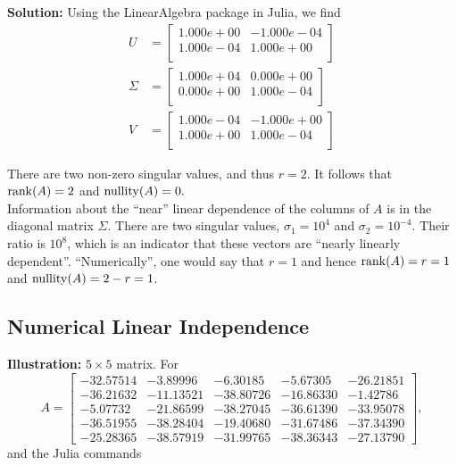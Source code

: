 \textbf{Solution:} Using the LinearAlgebra package in Julia, we find
\begin{align*}
    U& =\left[
\begin{array}{cc}
1.000e+00 & -1.000e-04 \\
1.000e-04 & 1.000e+00 \\
\end{array}
\right] \\
\Sigma&= \left[
\begin{array}{cc}
1.000e+04  & 0.000e+00\\
0.000e+00 & 1.000e-04 \\
\end{array}
\right]\\
V&= \left[
\begin{array}{cc}
1.000e-04 & -1.000e+00 \\
1.000e+00 & 1.000e-04 \\
\end{array}
\right]
\end{align*}

There are two non-zero singular values, and thus $r=2$. It follows that $\mathrm{rank}(A)=2$ and $\mathrm{nullity}(A)=0.$\\

Information about the ``near'' linear dependence of the columns of $A$ is in the diagonal matrix $\Sigma$. There are two singular values, $\sigma_1=10^4$ and $\sigma_2 = 10^{-4}$. Their ratio is $10^8$, which is an indicator that these vectors are ``nearly linearly dependent''. ``Numerically'', one would say that $r=1$ and hence $\mathrm{rank}(A) =r=1$ and $\mathrm{nullity}(A)=2-r=1$.
\Qed

    
\subsection{Numerical Linear Independence}

\textbf{Illustration:}  $5 \times 5$ matrix. For
$$A=\left[ \begin{array}{rrrrr}-32.57514& -3.89996& -6.30185& -5.67305& -26.21851\\-36.21632& -11.13521& -38.80726& -16.86330& -1.42786\\-5.07732& -21.86599& -38.27045& -36.61390& -33.95078\\-36.51955& -38.28404& -19.40680& -31.67486& -37.34390\\-25.28365& -38.57919& -31.99765& -38.36343& -27.13790\end{array}
 \right], $$
 and the Julia commands
 
